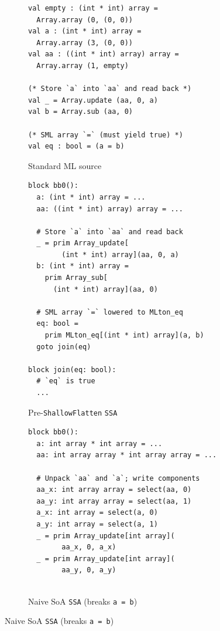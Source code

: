 \begin{figure}[htbp]
  \centering
  \begin{subfigure}[t]{0.48\textwidth}
    \caption{Standard ML source}
    \label{fig:soa_eq_sml}
    \vspace{1mm}
\begin{verbatim}
val empty : (int * int) array =
  Array.array (0, (0, 0))
val a : (int * int) array =
  Array.array (3, (0, 0))
val aa : ((int * int) array) array =
  Array.array (1, empty)

(* Store `a` into `aa` and read back *)
val _ = Array.update (aa, 0, a)
val b = Array.sub (aa, 0)

(* SML array `=` (must yield true) *)
val eq : bool = (a = b)
\end{verbatim}
  \end{subfigure}\hfill
  \begin{subfigure}[t]{0.48\textwidth}
    \caption{Pre-\texttt{ShallowFlatten} \texttt{SSA}}
    \label{fig:soa_eq_orig}
    \vspace{1mm}
\begin{verbatim}
block bb0():
  a: (int * int) array = ...
  aa: ((int * int) array) array = ...

  # Store `a` into `aa` and read back
  _ = prim Array_update[
        (int * int) array](aa, 0, a)
  b: (int * int) array =
    prim Array_sub[
      (int * int) array](aa, 0)

  # SML array `=` lowered to MLton_eq
  eq: bool =
    prim MLton_eq[(int * int) array](a, b)
  goto join(eq)

block join(eq: bool):
  # `eq` is true
  ...
\end{verbatim}
  \end{subfigure}

  \vspace{3mm}

  \begin{subfigure}[t]{0.48\textwidth}
    \caption{Naive SoA \texttt{SSA} (breaks \texttt{a = b})}
    \label{fig:soa_eq_bad}
    \vspace{1mm}
\begin{verbatim}
block bb0():
  a: int array * int array = ...
  aa: int array array * int array array = ...

  # Unpack `aa` and `a`; write components
  aa_x: int array array = select(aa, 0)
  aa_y: int array array = select(aa, 1)
  a_x: int array = select(a, 0)
  a_y: int array = select(a, 1)
  _ = prim Array_update[int array](
        aa_x, 0, a_x)
  _ = prim Array_update[int array](
        aa_y, 0, a_y)


\end{verbatim}
\end{subfigure}
\end{figure}
